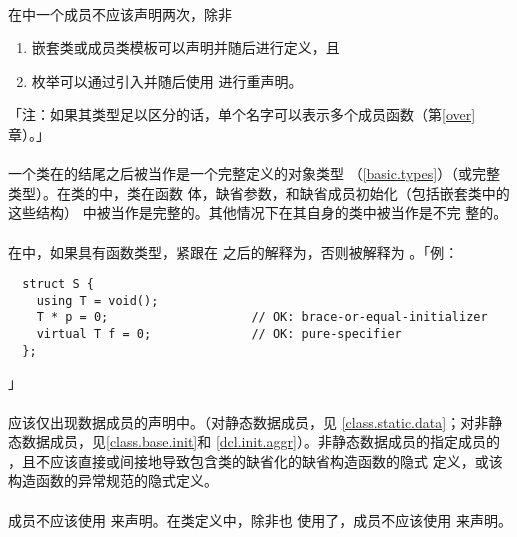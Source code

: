 \paragraph{}
在中一个成员不应该声明两次，除非
\begin{enumerate}
  \item{嵌套类或成员类模板可以声明并随后进行定义，且}
  \item{枚举可以通过引入并随后使用
    进行重声明。}
\end{enumerate}
「注：如果其类型足以区分的话，单个名字可以表示多个成员函数（第\ref{over}章）。」

\paragraph{}
一个类在的结尾\tm{\}}之后被当作是一个完整定义的对象类型
（\ref{basic.types}）（或完整类型）。在类的中，类在函数
体，缺省参数，和缺省成员初始化（包括嵌套类中的这些结构）
中被当作是完整的。其他情况下在其自身的类中被当作是不完
整的。

\paragraph{}
在中，如果具有函数类型，紧跟在
之后的\tm{=}解释为，否则被解释为
。「例：
\begin{lstlisting}
  struct S {
    using T = void();
    T * p = 0;                    // OK: brace-or-equal-initializer
    virtual T f = 0;              // OK: pure-specifier
  };
\end{lstlisting}」

\paragraph{}
应该仅出现数据成员的声明中。（对静态数据成员，见
\ref{class.static.data}；对非静态数据成员，见\ref{class.base.init}和
\ref{dcl.init.aggr}）。非静态数据成员的指定成员的
，且不应该直接或间接地导致包含类的缺省化的缺省构造函数的隐式
定义，或该构造函数的异常规范的隐式定义。

\paragraph{}
成员不应该使用 来声明。在类定义中，除非也
使用了，成员不应该使用 
来声明。

